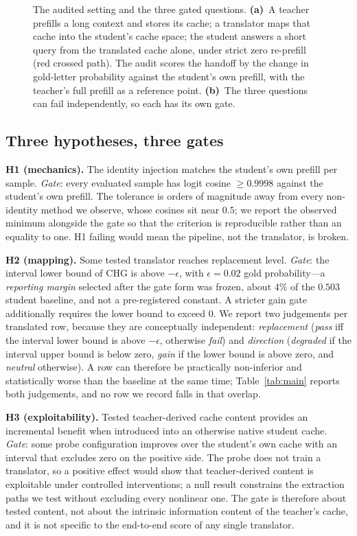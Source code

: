 \documentclass[10pt]{article}
\begin{document}
\begin{figure}[t]
\centering

\caption{The audited setting and the three gated questions. \textbf{(a)}~A
teacher prefills a long context and stores its cache; a translator maps that
cache into the student's cache space; the student answers a short query from the
translated cache alone, under strict zero re-prefill (red crossed path). The
audit scores the handoff by the change in gold-letter probability against the
student's own prefill, with the teacher's full prefill as a reference point.
\textbf{(b)}~The three questions can fail independently, so each has its own
gate.}
\label{fig:framework}
\end{figure}

\subsection{Three hypotheses, three gates}
\textbf{H1 (mechanics).} The identity injection matches the student's own
prefill per sample. \emph{Gate}: every evaluated sample has logit cosine
$\ge 0.9998$ against the student's own prefill. The tolerance is orders of
magnitude away from every non-identity method we observe, whose cosines sit near
$0.5$; we report the observed minimum alongside the gate so that the criterion
is reproducible rather than an equality to one. H1 failing would mean the
pipeline, not the translator, is broken.

\textbf{H2 (mapping).} Some tested translator reaches replacement level.
\emph{Gate}: the interval lower bound of CHG is above $-\epsilon$, with
$\epsilon=0.02$ gold probability---a \emph{reporting margin} selected after the
gate form was frozen, about $4\%$ of the $0.503$ student baseline, and not a
pre-registered constant. A stricter gain gate additionally requires the lower
bound to exceed $0$. We report two judgements per translated row, because they
are conceptually independent: \emph{replacement} (\emph{pass} iff the interval
lower bound is above $-\epsilon$, otherwise \emph{fail}) and \emph{direction}
(\emph{degraded} if the interval upper bound is below zero, \emph{gain} if the
lower bound is above zero, and \emph{neutral} otherwise). A row can therefore be
practically non-inferior and statistically worse than the baseline at the same
time; Table~\ref{tab:main} reports both judgements, and no row we record falls in
that overlap.

\textbf{H3 (exploitability).} Tested teacher-derived cache content provides an
incremental benefit when introduced into an otherwise native student cache.
\emph{Gate}: some probe configuration improves over the student's own cache with
an interval that excludes zero on the positive side. The probe does not train a
translator, so a positive effect would show that teacher-derived content is
exploitable under controlled interventions; a null result constrains the
extraction paths we test without excluding every nonlinear one. The gate is
therefore about tested content, not about the intrinsic information content of
the teacher's cache, and it is not specific to the end-to-end score of any
single translator.
\end{document}
